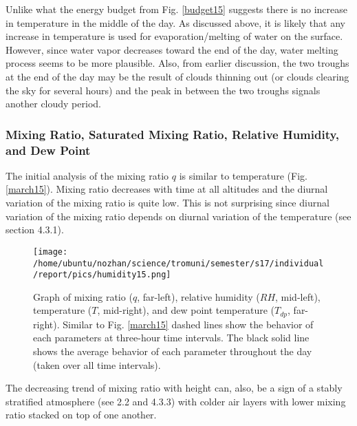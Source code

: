 \documentclass[a4paper,12pt]{article}
\numberwithin{equation}{section} %
\begin{document}
\vspace{1cm}

Unlike what the energy budget from Fig. \ref{budget15} suggests there is no increase in temperature in the middle of the day. As discussed above, it is likely that any increase in temperature is used for evaporation/melting of water on the surface. However, since water vapor decreases toward the end of the day, water melting process seems to be more plausible. Also, from earlier discussion, the two troughs at the end of the day may be the result of clouds thinning out (or clouds clearing the sky for several hours) and the peak in between the two troughs signals another cloudy period. %


\subsubsection{Mixing Ratio, Saturated Mixing Ratio, Relative Humidity, and Dew Point}

The initial analysis of the mixing ratio $q$ is similar to temperature (Fig. \ref{march15}). Mixing ratio decreases with time at all altitudes and the diurnal variation of the mixing ratio is quite low. This is not surprising since diurnal variation of the mixing ratio depends on diurnal variation of the temperature (see section 4.3.1).

\begin{figure}[bhp]
\texttt{[image: /home/ubuntu/nozhan/science/tromuni/semester/s17/individual/report/pics/humidity15.png]}
\caption{Graph of mixing ratio ($q$, far-left), relative humidity ($RH$, mid-left), temperature ($T$, mid-right), and dew point temperature ($T_{dp}$, far-right). Similar to Fig. \ref{march15} dashed lines show the behavior of each parameters at three-hour time intervals. The black solid line shows the average behavior of each parameter throughout the day (taken over all time intervals).}
\label{humidity15}
\end{figure}

The decreasing trend of mixing ratio with height can, also, be a sign of a stably stratified atmosphere (see 2.2 and 4.3.3) with colder air layers with lower mixing ratio stacked on top of one another.
\end{document}
